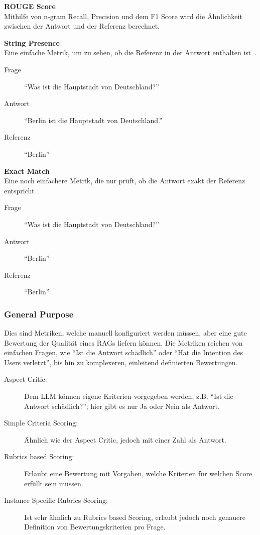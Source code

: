 \textbf{ROUGE Score}\\
Mithilfe von n-gram Recall, Precision und dem F1 Score wird die Ähnlichkeit zwischen der Antwort und der Referenz berechnet\cite{ragas_traditional_metrics}.

\textbf{String Presence}\\
Eine einfache Metrik, um zu sehen, ob die Referenz in der Antwort enthalten ist~\cite{ragas_traditional_metrics}.
\begin{description}
    \item[Frage] \enquote{Was ist die Hauptstadt von Deutschland?}
    \item [Antwort] \enquote{Berlin ist die Hauptstadt von Deutschland.}
    \item [Referenz] \enquote{Berlin}
\end{description}

\textbf{Exact Match}\\
Eine noch einfachere Metrik, die nur prüft, ob die Antwort exakt der Referenz entspricht~\cite{ragas_traditional_metrics}.
\begin{description}
    \item[Frage] \enquote{Was ist die Hauptstadt von Deutschland?}
    \item [Antwort] \enquote{Berlin}
    \item [Referenz] \enquote{Berlin}
\end{description}

\subsubsection{General Purpose}
Dies sind Metriken, welche manuell konfiguriert werden müssen, aber eine gute Bewertung der Qualität eines RAGs liefern können.
Die Metriken reichen von einfachen Fragen, wie \enquote{Ist die Antwort schädlich} oder \enquote{Hat die Intention des Users verletzt}, bis hin zu komplexeren, einleitend definierten Bewertungen.
\begin{description}
    \item [Aspect Critic:] Dem LLM können eigene Kriterien vorgegeben werden, z.B. \enquote{Ist die Antwort schädlich?}; hier gibt es nur Ja oder Nein als Antwort.
    \item [Simple Criteria Scoring:] Ähnlich wie der Aspect Critic, jedoch mit einer Zahl als Antwort.
    \item [Rubrics based Scoring:] Erlaubt eine Bewertung mit Vorgaben, welche Kriterien für welchen Score erfüllt sein müssen.
    \item [Instance Specific Rubrics Scoring:] Ist sehr ähnlich zu Rubrics based Scoring, erlaubt jedoch noch genauere Definition von Bewertungskriterien pro Frage.
\end{description}

